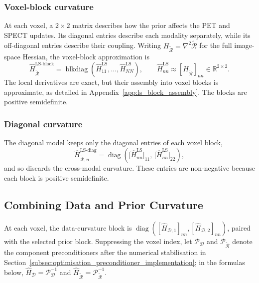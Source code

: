 \subsubsection{Voxel-block curvature}
\label{subsubsec:block_curvature_model}

At each voxel, a $2\times2$ matrix describes how the prior affects the PET and SPECT updates. Its diagonal entries describe each modality separately, while its off-diagonal entries describe their coupling. Writing $H_{\widetilde{\mathcal R}}=\nabla^2\widetilde{\mathcal R}$ for the full image-space Hessian, the voxel-block approximation is
\begin{equation}
    \widehat H_{\widetilde{\mathcal R}}^{\mathrm{LS\text{-}block}}
    =
    \operatorname{blkdiag}
    \left(
        \widehat H_{11}^{\mathrm{LS}},\ldots,\widehat H_{NN}^{\mathrm{LS}}
    \right),
    \qquad
    \widehat H_{nn}^{\mathrm{LS}}\approx[H_{\widetilde{\mathcal R}}]_{nn}\in\mathbb R^{2\times2}.
    \label{eq:ls_block_preconditioner}
\end{equation}
The local derivatives are exact, but their assembly into voxel blocks is approximate, as detailed in Appendix~\ref{app:ls_block_assembly}. The blocks are positive semidefinite.

\subsubsection{Diagonal curvature}
\label{subsubsec:diag_curvature_model}

The diagonal model keeps only the diagonal entries of each voxel block,
\begin{equation}
    \widehat H_{\widetilde{\mathcal R},n}^{\mathrm{LS\text{-}diag}}
    =
    \operatorname{diag}\!\left(
        \bigl[\widehat H_{nn}^{\mathrm{LS}}\bigr]_{11},\,
        \bigl[\widehat H_{nn}^{\mathrm{LS}}\bigr]_{22}
    \right),
    \label{eq:ls_diag_preconditioner}
\end{equation}
and so discards the cross-modal curvature. These entries are non-negative because each block is positive semidefinite.

\subsection{Combining Data and Prior Curvature}
\label{subsec:optimisation_preconditioner_combination}

At each voxel, the data-curvature block is $\operatorname{diag}([\widehat H_{\mathcal D,1}]_{nn},[\widehat H_{\mathcal D,2}]_{nn})$, paired with the selected prior block. Suppressing the voxel index, let $\mathcal P_{\mathcal D}$ and $\mathcal P_{\widetilde{\mathcal R}}$ denote the component preconditioners after the numerical stabilisation in Section~\ref{subsec:optimisation_preconditioner_implementation}; in the formulas below, $\widehat H_{\mathcal D}=\mathcal P_{\mathcal D}^{-1}$ and $\widehat H_{\widetilde{\mathcal R}}=\mathcal P_{\widetilde{\mathcal R}}^{-1}$.

